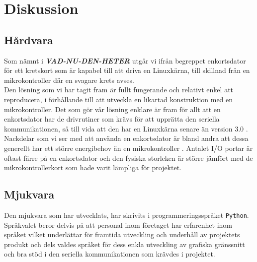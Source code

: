 \documentclass{article}
\begin{document}
    \newpage

    \section{Diskussion} %
    \label{sec:diskussion}
        \subsection{Hårdvara} %
        \label{sub:d_hardvara}
        
            Som nämnt i \textbf{\textit{VAD-NU-DEN-HETER}} utgår vi ifrån begreppet enkortsdator för ett kretskort som är kapabel till att driva en Linuxkärna, till skillnad från en mikrokontroller där en svagare krets avses. \\

            \noindent Den lösning som vi har tagit fram är fullt fungerande och relativt enkel att reproducera, i förhållande till att utveckla en likartad konstruktion med en mikrokontroller. Det som gör vår lösning enklare är fram för allt att en enkortsdator har de drivrutiner som krävs för att upprätta den seriella kommunikationen, så till vida att den har en Linuxkärna senare än version 3.0 \cite{silicon}. \\

            \noindent Nackdelar som vi ser med att använda en enkortsdator är bland andra att dessa generellt har ett större energibehov än en mikrokontroller \cite{gadgetBlog, rasp}. Antalet I/O portar är oftast färre på en enkortsdator och den fysiska storleken är större jämfört med de mikrokontrollerkort som hade varit lämpliga för projektet.\\


        \subsection{Mjukvara} %
        \label{sub:d_mjukvara}

            Den mjukvara som har utvecklats, har skrivits i programmeringsspråket \texttt{Python}. Språk\-valet beror delvis på att personal inom företaget har erfarenhet inom språket vilket underlättar för framtida utveckling och underhåll av projektets produkt och dels valdes språket för dess enkla utveckling av grafiska gränssnitt och bra stöd i den seriella kommunikationen som krävdes i projektet. \\
\end{document}
